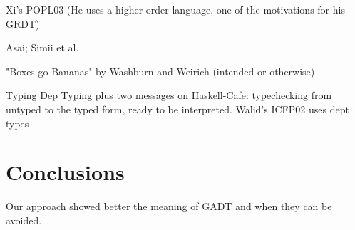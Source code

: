 \documentclass[preprint]{sigplanconf}
\begin{document}
Xi's POPL03 (He uses a higher-order language, one of the motivations
for his GRDT)

Asai; Simii et al.

"Boxes go Bananas" by Washburn and Weirich (intended or otherwise)


Typing Dep Typing plus two messages on Haskell-Cafe: typechecking 
from untyped to the typed form, ready to be interpreted. Walid's ICFP02
uses dept types


\section{Conclusions}

Our approach showed better the meaning of GADT and when they can be
avoided.
\end{document}
